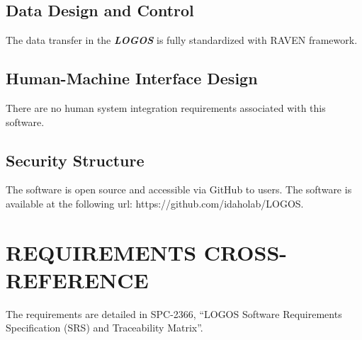 \subsection{Data Design and Control}
The data transfer in the \textbf{\textit{LOGOS}} is fully standardized with RAVEN framework.

\subsection{Human-Machine Interface Design}
There are no human system integration requirements associated with this software.

\subsection{Security Structure}
The software is open source and accessible via GitHub to users.
The software is available at the following url: https://github.com/idaholab/LOGOS.

\section{REQUIREMENTS CROSS-REFERENCE}
The requirements are detailed in SPC-2366, ``LOGOS Software Requirements Specification (SRS) and Traceability Matrix''.
